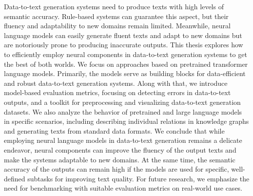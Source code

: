 Data-to-text generation systems need to produce texts with high levels of semantic accuracy. Rule-based systems can guarantee this aspect, but their fluency and adaptability to new domains remain limited. Meanwhile, neural language models can easily generate fluent texts and adapt to new domains but are notoriously prone to producing inaccurate outputs. This thesis explores how to efficiently employ neural components in data-to-text generation systems to get the best of both worlds. We focus on approaches based on pretrained transformer language models. Primarily, the models serve as building blocks for data-efficient and robust data-to-text generation systems. Along with that, we introduce model-based evaluation metrics, focusing on detecting errors in data-to-text outputs, and a toolkit for preprocessing and visualizing data-to-text generation datasets. We also analyze the behavior of pretrained and large language models in specific scenarios, including describing individual relations in knowledge graphs and generating texts from standard data formats. We conclude that while employing neural language models in data-to-text generation remains a delicate endeavor, neural components can improve the fluency of the output texts and make the systems adaptable to new domains. At the same time, the semantic accuracy of the outputs can remain high if the models are used for specific, well-defined subtasks for improving text quality. For future research, we emphasize the need for benchmarking with suitable evaluation metrics on real-world use cases.